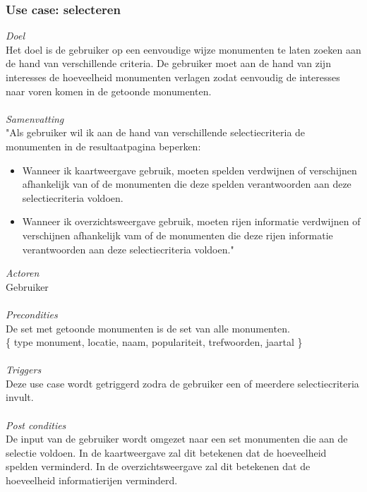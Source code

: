 \documentclass[a4paper,10pt]{article}
\begin{document}
			\subsubsection{Use case: selecteren}
			\textit{Doel}\\
			Het doel is de gebruiker op een eenvoudige wijze monumenten te laten zoeken aan de hand van verschillende criteria. De gebruiker moet aan de hand van zijn interesses de hoeveelheid monumenten verlagen zodat eenvoudig de interesses naar voren komen in de getoonde monumenten.\\ \\
			\textit{Samenvatting}\\
			"Als gebruiker wil ik aan de hand van verschillende selectiecriteria de monumenten in de resultaatpagina beperken:
			\begin{itemize}
				\item Wanneer ik kaartweergave gebruik, moeten spelden verdwijnen of verschijnen afhankelijk van of de monumenten die deze spelden verantwoorden aan deze selectiecriteria voldoen.
				\item Wanneer ik overzichtsweergave gebruik, moeten rijen informatie verdwijnen of verschijnen afhankelijk vam of de monumenten die deze rijen informatie verantwoorden aan deze selectiecriteria voldoen."
			\end{itemize}
			\textit{Actoren}\\
			Gebruiker\\ \\
			\textit{Precondities}\\
			De set met getoonde monumenten is de set van alle monumenten.\\
			\{ type monument, locatie, naam, populariteit, trefwoorden, jaartal \} \\ \\
			\textit{Triggers}\\
			Deze use case wordt getriggerd zodra de gebruiker een of meerdere selectiecriteria invult.\\ \\
			\textit{Post condities}\\			
			De input van de gebruiker wordt omgezet naar een set monumenten die aan de selectie voldoen. In de kaartweergave zal dit betekenen dat de hoeveelheid spelden verminderd. In de overzichtsweergave zal dit betekenen dat de hoeveelheid informatierijen verminderd.		
			
\end{document}
